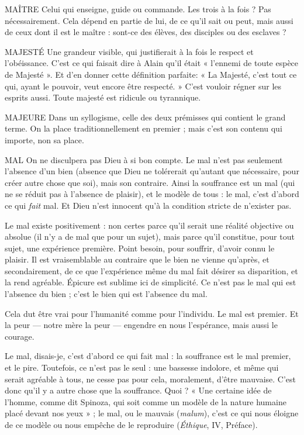 MAÎTRE Celui qui enseigne, guide ou commande. Les trois à la fois ? Pas
nécessairement. Cela dépend en partie de lui, de ce qu’il sait ou
peut, mais aussi de ceux dont il est le maître : sont-ce des élèves, des disciples
ou des esclaves ?

MAJESTÉ Une grandeur visible, qui justifierait à la fois le respect et l’obéissance.
C’est ce qui faisait dire à Alain qu'il était « l’ennemi de
toute espèce de Majesté ». Et d’en donner cette définition parfaite: « La
Majesté, c'est tout ce qui, ayant le pouvoir, veut encore être respecté. » C’est
vouloir régner sur les esprits aussi. Toute majesté est ridicule ou tyrannique.

MAJEURE Dans un syllogisme, celle des deux prémisses qui contient le
grand terme. On la place traditionnellement en premier ; mais
c'est son contenu qui importe, non sa place.

MAL On ne disculpera pas Dieu à si bon compte. Le mal n’est pas seulement
l’absence d’un bien (absence que Dieu ne tolérerait qu’autant
que nécessaire, pour créer autre chose que soi), mais son contraire. Ainsi la
souffrance est un mal (qui ne se réduit pas à l’absence de plaisir), et le modèle
de tous : le mal, c’est d’abord ce qui {\it fait} mal. Et Dieu n’est innocent qu’à la
condition stricte de n’exister pas.

Le mal existe positivement : non certes parce qu’il serait une réalité objective
ou absolue (il n’y a de mal que pour un sujet), mais parce qu’il constitue,
pour tout sujet, une expérience première. Point besoin, pour souffrir, d’avoir
connu le plaisir. Il est vraisemblable au contraire que le bien ne vienne
qu'après, et secondairement, de ce que l’expérience même du mal fait désirer
sa disparition, et la rend agréable. Épicure est sublime ici de simplicité. Ce
n'est pas le mal qui est l'absence du bien ; c’est le bien qui est l’absence du
mal.

Cela dut être vrai pour l'humanité comme pour l'individu. Le mal est premier.
Et la peur — notre mère la peur — engendre en nous l’espérance, mais aussi
le courage.

Le mal, disais-je, c'est d’abord ce qui fait mal : la souffrance est le mal premier,
et le pire. Toutefois, ce n’est pas le seul : une bassesse indolore, et même qui
serait agréable à tous, ne cesse pas pour cela, moralement, d’être mauvaise. C’est
donc qu’il y a autre chose que la souffrance. Quoi ? « Une certaine idée de
l’homme, comme dit Spinoza, qui soit comme un modèle de la nature humaine
placé devant nos yeux » ; le mal, ou le mauvais ({\it malum}), c’est ce qui nous éloigne
de ce modèle ou nous empêche de le reproduire ({\it Éthique}, IV, Préface).

